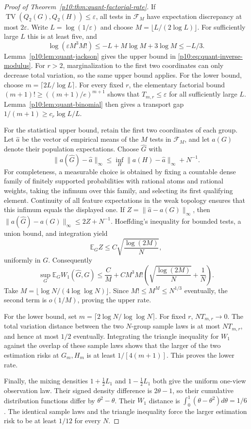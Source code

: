 \documentclass[11pt,letterpaper]{article}
\theoremstyle{definition}
\theoremstyle{remark}
\newcommand{\1}{\mathbf 1}
\begin{document}
\begin{proof}[Proof of Theorem~\ref{p10:thm:quant-factorial-rate}]
If $\operatorname{TV}(Q_2(G),Q_2(H))\le\varepsilon$, all tests in
$\mathcal F_M$ have expectation discrepancy at most $2\varepsilon$.
Write $L=\log(1/\varepsilon)$ and choose
$M=\lfloor L/(2\log L)\rfloor$.  For sufficiently large $L$ this
is at least five, and
\[
 \log(\varepsilon M^3M!)
 \le-L+M\log M+3\log M\le-L/3.
\]
Lemma~\ref{p10:lem:quant-jackson} gives the upper bound in
\eqref{p10:eq:quant-inverse-modulus}.  For $r>2$, marginalization to
the first two coordinates can only decrease total variation, so
the same upper bound applies.  For the lower bound, choose
$m=\lceil2L/\log L\rceil$.  For every fixed $r$, the elementary
factorial bound $(m+1)!\ge((m+1)/e)^{m+1}$ shows that
$T_{m,r}\le\varepsilon$ for all sufficiently large $L$.
Lemma~\ref{p10:lem:quant-binomial} then gives a transport gap
$1/(m+1)\ge c_r\log L/L$.

For the statistical upper bound, retain the first two coordinates of
each group.  Let $\widehat a$ be the vector of empirical means of the
$M$ tests in $\mathcal F_M$, and let $a(G)$ denote their population
expectations.  Choose $\widehat G$ with
\[
 \|a(\widehat G)-\widehat a\|_\infty
 \le\inf_{H}\|a(H)-\widehat a\|_\infty+N^{-1}.
\]
For completeness, a measurable choice is obtained by fixing a
countable dense family of finitely supported probabilities with
rational atoms and rational weights, taking the infimum over this
family, and selecting its first qualifying element.  Continuity
of all feature expectations in the weak topology ensures that
this infimum equals the displayed one.
If $Z=\|\widehat a-a(G)\|_\infty$, then
$\|a(\widehat G)-a(G)\|_\infty\le2Z+N^{-1}$.
Hoeffding's inequality for bounded tests, a union bound, and
integration yield
\[
 \mathbb E_G Z\le C\sqrt{\frac{\log(2M)}{N}},
\]
uniformly in $G$.  Consequently
\[
 \sup_G\mathbb E_G W_1(\widehat G,G)
 \le\frac C M+CM^3M!
       \left(\sqrt{\frac{\log(2M)}{N}}+\frac1N\right).
\]
Take $M=\lfloor\log N/(4\log\log N)\rfloor$.
Since $M!\le M^M\le N^{1/3}$ eventually, the second term is
$o(1/M)$, proving the upper rate.

For the lower bound, set $m=\lceil2\log N/\log\log N\rceil$.
For fixed $r$, $NT_{m,r}\to0$.  The total variation distance
between the two $N$-group sample laws is at most $NT_{m,r}$,
and hence at most $1/2$ eventually.  Integrating the triangle
inequality for $W_1$ against the overlap of these sample laws
shows that the larger of the two estimation risks at $G_m,H_m$
is at least $1/[4(m+1)]$.  This proves the lower rate.

Finally, the mixing densities $1+\tfrac12L_1$ and
$1-\tfrac12L_1$ both give the uniform one-view observation law.
Their signed density difference is $2\theta-1$, so their
cumulative distribution functions differ by $\theta^2-\theta$.
Their $W_1$ distance is $\int_0^1(\theta-\theta^2)d\theta=1/6$.
The identical sample laws and the triangle inequality force
the larger estimation risk to be at least $1/12$ for every $N$.
\end{proof}
\end{document}
